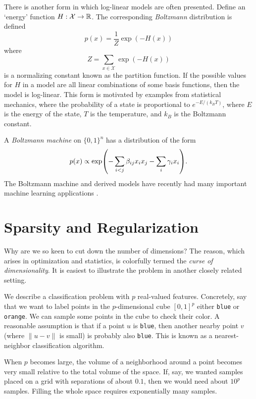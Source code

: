 \documentclass[cclicense]{hmcthesis}
\providecommand*{\xs}{\mathcal X}
\numberwithin{equation}{chapter}
\numberwithin{thmcounter}{chapter}
\begin{document}
    There is another form in which log-linear models are often presented.
    Define an `energy' function $H: \xs \to \R$.  The corresponding
    \emph{Boltzmann} distribution is defined
    \[
        p(x) = \frac 1 Z \exp(-H(x))
    \]
    where
    \[
        Z = \sum_{x \in \xs} \exp(-H(x))
    \]
    is a normalizing constant known as the partition function.  If the possible
    values for $H$ in a model are all linear combinations of some basis
    functions, then the model is log-linear.  This form is motivated by examples
    from statistical mechanics, where the probability of a state is proportional
    to $e^{-E/(k_BT)}$, where $E$ is the energy of the state, $T$ is the
    temperature, and $k_B$ is the Boltzmann constant.

    \begin{example}
        A \emph{Boltzmann machine} on $\{0, 1\}^n$ has a distribution of the
        form
        \[
            p(x) \propto \exp\pdel*{-\sum_{i < j} \beta_{ij} x_i x_j  - \sum_i
            \gamma_i x_i}.
        \]
        The Boltzmann machine and derived models have recently had many
        important machine learning applications \citep{Hin07}.
    \end{example}

\section{Sparsity and Regularization}
    \label{sec:regularization}

    Why are we so keen to cut down the number of dimensions?  The reason, which
    arises in optimization and statistics, is colorfully termed the \emph{curse
    of dimensionality}.  It is easiest to illustrate the problem in another
    closely related setting.

    \begin{example}
        We describe a classification problem with $p$ real-valued features.
        Concretely, say that we want to label points in the $p$-dimensional cube
        $[0, 1]^p$ either \texttt{blue} or \texttt{orange}.  We can sample some
        points in the cube to check their color.  A reasonable assumption is
        that if a point $u$ is \texttt{blue}, then another nearby point $v$
        (where $\|u - v\|$ is small) is probably also \texttt{blue}.  This is
        known as a nearest-neighbor classification algorithm.  
        
        When $p$ becomes large, the volume of a neighborhood around a point
        becomes very small relative to the total volume of the space.  If, say,
        we wanted samples placed on a grid with separations of about $0.1$, then
        we would need about $10^p$ samples.  Filling the whole space requires
        exponentially many samples.
    \end{example}
\end{document}

